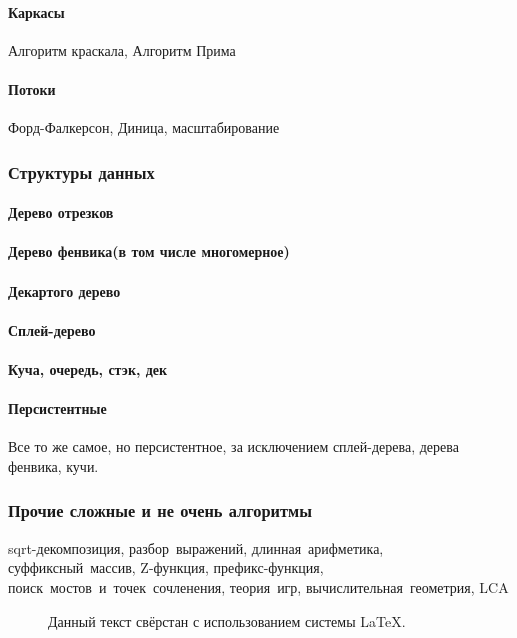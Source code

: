 \documentclass[a4paper,10pt]{article}
\begin{document}
{{{	    \paragraph{Каркасы}{Алгоритм краскала, Алгоритм Прима}
	    \paragraph{Потоки}{Форд-Фалкерсон, Диница, масштабирование}
	}
	\subsubsection{Структуры данных}{
	    \paragraph{Дерево отрезков}{}
	    \paragraph{Дерево фенвика(в том числе многомерное)}{}
	    \paragraph{Декартого дерево}{}
	    \paragraph{Сплей-дерево}{}
	    \paragraph{Куча, очередь, стэк, дек}{}
	    \paragraph{Персистентные}{Все то же самое, но персистентное, за исключением сплей-дерева, дерева фенвика, кучи.}
	}
	\subsubsection{Прочие сложные и не очень алгоритмы}{sqrt-декомпозиция, разбор~выражений, длинная~арифметика, 
			суффиксный~массив, Z-функция, префикс-функция, поиск~мостов~и~точек~сочленения, теория~игр, 
			вычислительная~геометрия, LCA}
    }
}
\begin{figure}[b]
    Данный текст свёрстан с использованием системы \LaTeX.
\end{figure}
\end{document}
